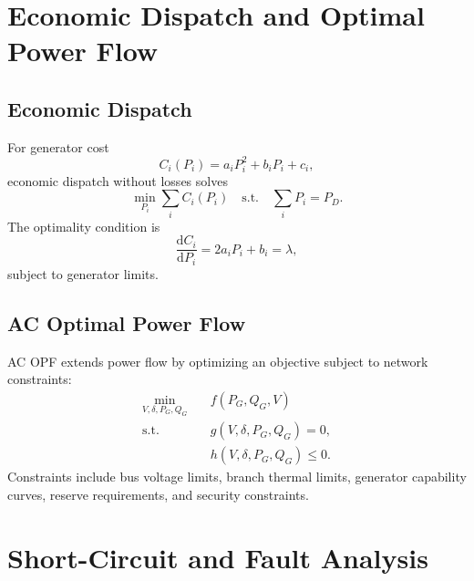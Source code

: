 \documentclass[11pt]{article}
\newcommand{\dd}{\mathrm{d}}
\begin{document}
\section{Economic Dispatch and Optimal Power Flow}

\subsection{Economic Dispatch}
For generator cost
\begin{equation}
C_i(P_i)=a_iP_i^2+b_iP_i+c_i,
\end{equation}
economic dispatch without losses solves
\begin{equation}
\min_{P_i}\sum_i C_i(P_i)
\quad \text{s.t.}\quad
\sum_i P_i=P_D.
\end{equation}
The optimality condition is
\begin{equation}
\frac{\dd C_i}{\dd P_i}=2a_iP_i+b_i=\lambda,
\end{equation}
subject to generator limits.

\subsection{AC Optimal Power Flow}
AC OPF extends power flow by optimizing an objective subject to network
constraints:
\begin{align}
\min_{V,\delta,P_G,Q_G} \quad & f(P_G,Q_G,V)\\
\text{s.t.}\quad & g(V,\delta,P_G,Q_G)=0,\\
& h(V,\delta,P_G,Q_G)\le 0.
\end{align}
Constraints include bus voltage limits, branch thermal limits, generator
capability curves, reserve requirements, and security constraints.

\section{Short-Circuit and Fault Analysis}
\end{document}
